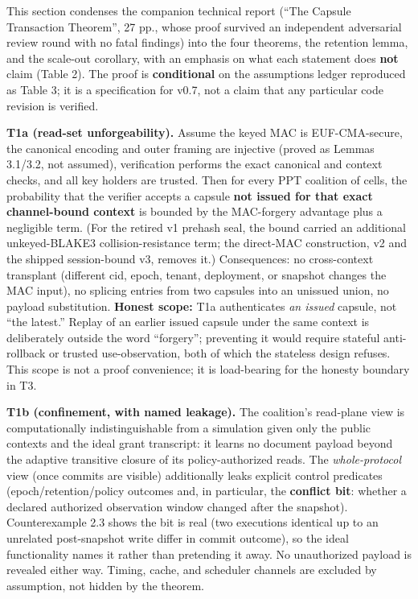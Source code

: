 \documentclass[
  11pt,
]{article}
\begin{document}
This section condenses the companion technical report (``The Capsule Transaction Theorem'', 27 pp., whose proof survived an independent adversarial review round with no fatal findings) into the four theorems, the retention lemma, and the scale-out corollary, with an emphasis on what each statement does \textbf{not} claim (Table 2). The proof is \textbf{conditional} on the assumptions ledger reproduced as Table 3; it is a specification for v0.7, not a claim that any particular code revision is verified.

\textbf{T1a (read-set unforgeability).} Assume the keyed MAC is EUF-CMA-secure, the canonical encoding and outer framing are injective (proved as Lemmas 3.1/3.2, not assumed), verification performs the exact canonical and context checks, and all key holders are trusted. Then for every PPT coalition of cells, the probability that the verifier accepts a capsule \textbf{not issued for that exact channel-bound context} is bounded by the MAC-forgery advantage plus a negligible term. (For the retired v1 prehash seal, the bound carried an additional unkeyed-BLAKE3 collision-resistance term; the direct-MAC construction, v2 and the shipped session-bound v3, removes it.) Consequences: no cross-context transplant (different cid, epoch, tenant, deployment, or snapshot changes the MAC input), no splicing entries from two capsules into an unissued union, no payload substitution. \textbf{Honest scope:} T1a authenticates \emph{an issued} capsule, not ``the latest.'' Replay of an earlier issued capsule under the same context is deliberately outside the word ``forgery''; preventing it would require stateful anti-rollback or trusted use-observation, both of which the stateless design refuses. This scope is not a proof convenience; it is load-bearing for the honesty boundary in T3.

\textbf{T1b (confinement, with named leakage).} The coalition's read-plane view is computationally indistinguishable from a simulation given only the public contexts and the ideal grant transcript: it learns no document payload beyond the adaptive transitive closure of its policy-authorized reads. The \emph{whole-protocol} view (once commits are visible) additionally leaks explicit control predicates (epoch/retention/policy outcomes and, in particular, the \textbf{conflict bit}: whether a declared authorized observation window changed after the snapshot). Counterexample 2.3 shows the bit is real (two executions identical up to an unrelated post-snapshot write differ in commit outcome), so the ideal functionality names it rather than pretending it away. No unauthorized payload is revealed either way. Timing, cache, and scheduler channels are excluded by assumption, not hidden by the theorem.
\end{document}
